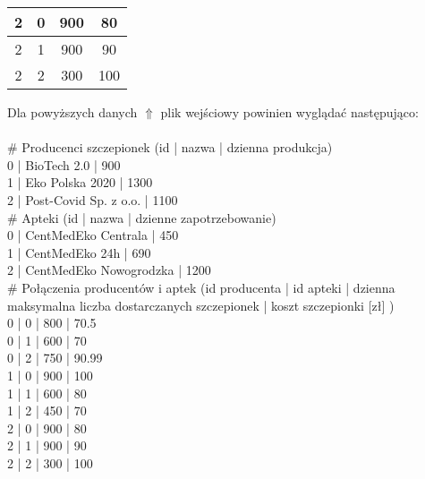 \documentclass[]{article}
\begin{document}
\begin{table}[h!]
{\begin{tabular}{|c|c|c|c|}
		2                      & 0                                          & 900                                                          & 80                                  \\ \hline
		2                      & 1                                          & 900                                                          & 90                                  \\ \hline
		2                      & 2                                          & 300                                                          & 100                                 \\ \hline
	\end{tabular}
	}
\end{table}

 Dla powyższych danych $\Uparrow$  plik wejściowy powinien wyglądać następująco:\\\\
\# Producenci szczepionek (id | nazwa | dzienna produkcja)\\
0 | BioTech 2.0 | 900\\
1 | Eko Polska 2020 | 1300\\
2 | Post-Covid Sp. z o.o. | 1100\\
\# Apteki (id | nazwa | dzienne zapotrzebowanie)\\
0 | CentMedEko Centrala | 450\\
1 | CentMedEko 24h | 690\\
2 | CentMedEko Nowogrodzka | 1200\\
\# Połączenia producentów i aptek (id producenta | id apteki | dzienna maksymalna liczba dostarczanych szczepionek | koszt szczepionki [zł] )\\
0 | 0 | 800 | 70.5\\
0 | 1 | 600 | 70\\
0 | 2 | 750 | 90.99\\
1 | 0 | 900 | 100\\
1 | 1 | 600 | 80\\
1 | 2 | 450 | 70\\
2 | 0 | 900 | 80\\
2 | 1 | 900 | 90\\
2 | 2 | 300 | 100\\




\clearpage
\end{document}

